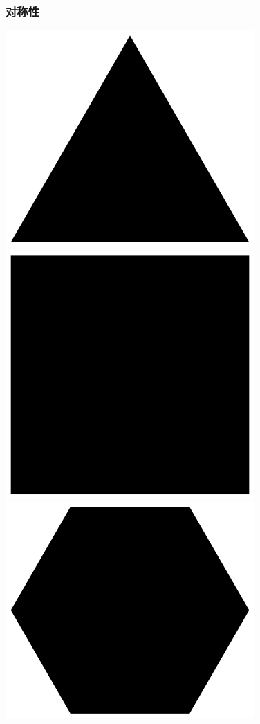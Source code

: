 \documentclass[CJK]{beamer}
\begin{document}
\begin{frame}
\frametitle{\bch 对称性 \ech}
\bch

\begin{center}
\includegraphics[scale=0.15]{rtri}
\includegraphics[scale=0.15]{pol4}
\includegraphics[scale=0.15]{pol6}

\end{center}
\end{frame}
\end{document}
